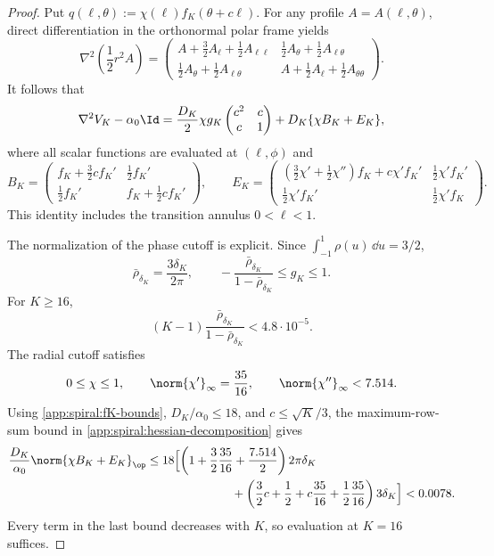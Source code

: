 \begin{proof}
Put \(q(\ell,\theta):=\chi(\ell)f_K(\theta+c\ell)\).  For any profile
\(A=A(\ell,\theta)\), direct differentiation in the orthonormal polar
frame yields
\[
    \nabla^2\left(\frac12r^2A\right)
    =
    \begin{pmatrix}
      A+\frac32A_\ell+\frac12A_{\ell\ell}
      &\frac12A_\theta+\frac12A_{\ell\theta}\\[1mm]
      \frac12A_\theta+\frac12A_{\ell\theta}
      &A+\frac12A_\ell+\frac12A_{\theta\theta}
    \end{pmatrix}.
\]
It follows that
\begin{equation}
\label{app:spiral:hessian-decomposition}
 \nabla^2V_K-\alpha_0\Id
 =\frac{D_K}{2}\chi g_K
     \begin{pmatrix}c^2&c\\c&1\end{pmatrix}
   +D_K\{\chi B_K+E_K\},
\end{equation}
where all scalar functions are evaluated at \((\ell,\phi)\) and
\[
 B_K=
 \begin{pmatrix}
 f_K+\frac32cf_K'&\frac12f_K'\\
 \frac12f_K'&f_K+\frac12cf_K'
 \end{pmatrix},
 \qquad
 E_K=
 \begin{pmatrix}
 (\frac32\chi'+\frac12\chi'')f_K+c\chi'f_K'&\frac12\chi'f_K'\\
 \frac12\chi'f_K'&\frac12\chi'f_K
 \end{pmatrix}.
\]
This identity includes the transition annulus \(0<\ell<1\).

The normalization of the phase cutoff is explicit.  Since
\(\int_{-1}^1\rho(u)\,\dd u=3/2\),
\[
 \bar\rho_{\delta_K}=\frac{3\delta_K}{2\pi},
 \qquad
 -\frac{\bar\rho_{\delta_K}}{1-\bar\rho_{\delta_K}}
 \leq g_K\leq1.
\]
For \(K\geq16\),
\begin{equation}
\label{app:spiral:negative-background}
 (K-1)\frac{\bar\rho_{\delta_K}}{1-\bar\rho_{\delta_K}}
 <4.8\cdot10^{-5}.
\end{equation}
The radial cutoff satisfies
\[
 0\leq\chi\leq1,
 \qquad
 \norm{\chi'}_\infty=\frac{35}{16},
 \qquad
 \norm{\chi''}_\infty<7.514.
\]
Using \eqref{app:spiral:fK-bounds}, \(D_K/\alpha_0\leq18\), and
\(c\leq\sqrt K/3\), the maximum-row-sum bound in
\eqref{app:spiral:hessian-decomposition} gives
\begin{align*}
 \frac{D_K}{\alpha_0}\norm{\chi B_K+E_K}_{\op}
 &\leq18\Bigl[
   \left(1+\frac32\frac{35}{16}+\frac{7.514}{2}\right)2\pi\delta_K\\
 &\hspace{25mm}
  +\left(\frac32c+\frac12+c\frac{35}{16}
         +\frac12\frac{35}{16}\right)3\delta_K
  \Bigr]
 <0.0078.
\end{align*}
Every term in the last bound decreases with \(K\), so evaluation at \(K=16\)
suffices.


\end{proof}
